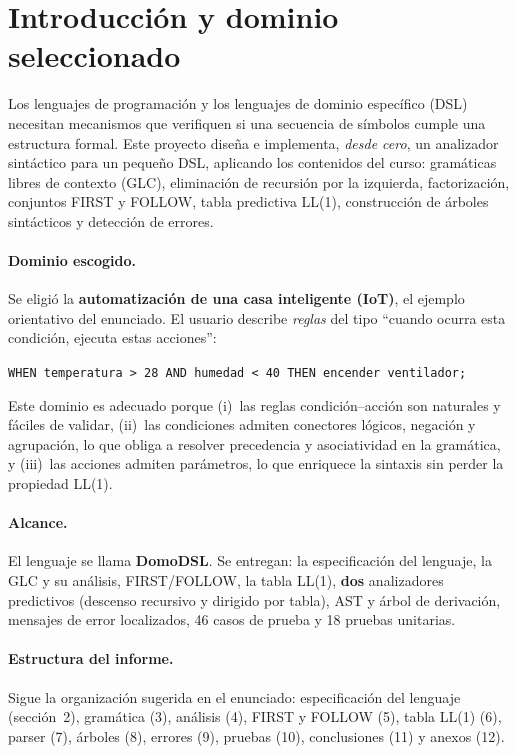 \ifnum{}

\section{Introducción y dominio seleccionado}

Los lenguajes de programación y los lenguajes de dominio específico (DSL) necesitan mecanismos que verifiquen si
una secuencia de símbolos cumple una estructura formal. Este proyecto diseña e implementa, \emph{desde cero},
un analizador sintáctico para un pequeño DSL, aplicando los contenidos del curso: gramáticas libres de contexto (GLC),
eliminación de recursión por la izquierda, factorización, conjuntos FIRST y FOLLOW, tabla predictiva LL(1),
construcción de árboles sintácticos y detección de errores.

\paragraph{Dominio escogido.} Se eligió la \textbf{automatización de una casa inteligente (IoT)}, el ejemplo
orientativo del enunciado. El usuario describe \emph{reglas} del tipo ``cuando ocurra esta condición, ejecuta estas acciones'':
\begin{center}\texttt{WHEN temperatura > 28 AND humedad < 40 THEN encender ventilador;}\end{center}
Este dominio es adecuado porque (i)~las reglas condición--acción son naturales y fáciles de validar, (ii)~las condiciones admiten
conectores lógicos, negación y agrupación, lo que obliga a resolver precedencia y asociatividad en la gramática, y
(iii)~las acciones admiten parámetros, lo que enriquece la sintaxis sin perder la propiedad LL(1).

\paragraph{Alcance.} El lenguaje se llama \textbf{DomoDSL}. Se entregan: la especificación del lenguaje, la GLC y su
análisis, FIRST/FOLLOW, la tabla LL(1), \textbf{dos} analizadores predictivos (descenso recursivo y dirigido por tabla),
AST y árbol de derivación, mensajes de error localizados, 46 casos de prueba y 18 pruebas unitarias.

\paragraph{Estructura del informe.} Sigue la organización sugerida en el enunciado: especificación del lenguaje
(sección~2), gramática (3), análisis (4), FIRST y FOLLOW (5), tabla LL(1) (6), parser (7), árboles (8), errores (9),
pruebas (10), conclusiones (11) y anexos (12).

